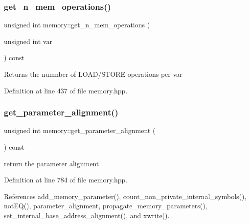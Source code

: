 \subsubsection{\texorpdfstring{get\+\_\+n\+\_\+mem\+\_\+operations()}{get\_n\_mem\_operations()}}
{\footnotesize\ttfamily unsigned int memory\+::get\+\_\+n\+\_\+mem\+\_\+operations (\begin{DoxyParamCaption}\item[{unsigned int}]{var }\end{DoxyParamCaption}) const\hspace{0.3cm}{\ttfamily [inline]}}

\begin{DoxyReturn}{Returns}
the numnber of L\+O\+A\+D/\+S\+T\+O\+RE operations per var 
\end{DoxyReturn}


Definition at line 437 of file memory.\+hpp.

\mbox{\label{classmemory_a0b03a8a5198dc85c9c6b1f26bc5464ec}} 
\subsubsection{\texorpdfstring{get\+\_\+parameter\+\_\+alignment()}{get\_parameter\_alignment()}}
{\footnotesize\ttfamily unsigned int memory\+::get\+\_\+parameter\+\_\+alignment (\begin{DoxyParamCaption}{ }\end{DoxyParamCaption}) const\hspace{0.3cm}{\ttfamily [inline]}}



return the parameter alignment 



Definition at line 784 of file memory.\+hpp.



References add\+\_\+memory\+\_\+parameter(), count\+\_\+non\+\_\+private\+\_\+internal\+\_\+symbols(), not\+E\+Q(), parameter\+\_\+alignment, propagate\+\_\+memory\+\_\+parameters(), set\+\_\+internal\+\_\+base\+\_\+address\+\_\+alignment(), and xwrite().

